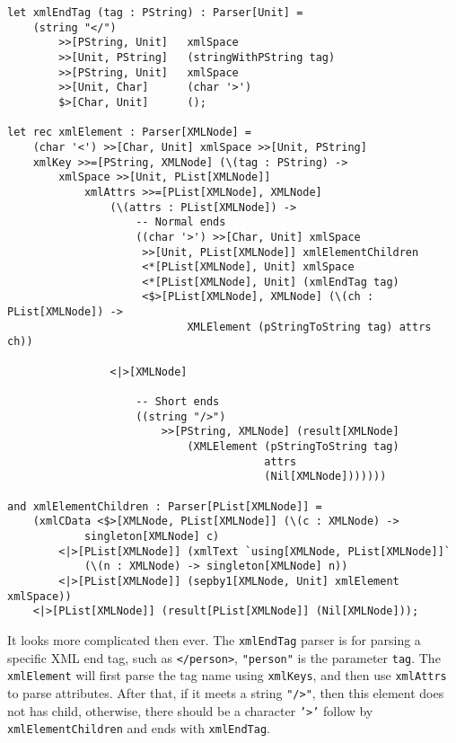 \begin{lstlisting}
let xmlEndTag (tag : PString) : Parser[Unit] =
    (string "</")
        >>[PString, Unit]   xmlSpace
        >>[Unit, PString]   (stringWithPString tag)
        >>[PString, Unit]   xmlSpace
        >>[Unit, Char]      (char '>')
        $>[Char, Unit]      ();

let rec xmlElement : Parser[XMLNode] =
    (char '<') >>[Char, Unit] xmlSpace >>[Unit, PString]
    xmlKey >>=[PString, XMLNode] (\(tag : PString) ->
        xmlSpace >>[Unit, PList[XMLNode]]
            xmlAttrs >>=[PList[XMLNode], XMLNode]
                (\(attrs : PList[XMLNode]) ->
                    -- Normal ends
                    ((char '>') >>[Char, Unit] xmlSpace
                     >>[Unit, PList[XMLNode]] xmlElementChildren
                     <*[PList[XMLNode], Unit] xmlSpace
                     <*[PList[XMLNode], Unit] (xmlEndTag tag)
                     <$>[PList[XMLNode], XMLNode] (\(ch : PList[XMLNode]) ->
                            XMLElement (pStringToString tag) attrs ch))

                <|>[XMLNode]

                    -- Short ends
                    ((string "/>")
                        >>[PString, XMLNode] (result[XMLNode]
                            (XMLElement (pStringToString tag)
                                        attrs
                                        (Nil[XMLNode]))))))

and xmlElementChildren : Parser[PList[XMLNode]] =
    (xmlCData <$>[XMLNode, PList[XMLNode]] (\(c : XMLNode) ->
            singleton[XMLNode] c)
        <|>[PList[XMLNode]] (xmlText `using[XMLNode, PList[XMLNode]]`
            (\(n : XMLNode) -> singleton[XMLNode] n))
        <|>[PList[XMLNode]] (sepby1[XMLNode, Unit] xmlElement xmlSpace))
    <|>[PList[XMLNode]] (result[PList[XMLNode]] (Nil[XMLNode]));
\end{lstlisting}

It looks more complicated then ever. The \texttt{xmlEndTag} parser is for parsing a specific XML end tag, such as \texttt{</person>}, \texttt{"person"} is the parameter \texttt{tag}. The \texttt{xmlElement} will first parse the tag name using \texttt{xmlKeys}, and then use \texttt{xmlAttrs} to parse attributes. After that, if it meets a string \texttt{"/>"}, then this element does not has child, otherwise, there should be a character \texttt{'\textgreater'} follow by \texttt{xmlElementChildren} and ends with \texttt{xmlEndTag}.

